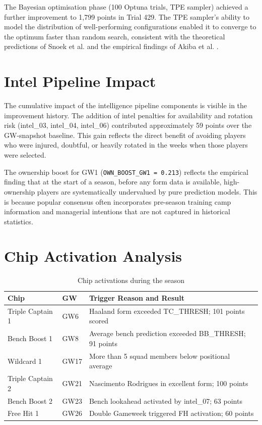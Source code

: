 The Bayesian optimisation phase (100 Optuna trials, TPE sampler) achieved a further improvement to 1,799 points in Trial 429. The TPE sampler's ability to model the distribution of well-performing configurations enabled it to converge to the optimum faster than random search, consistent with the theoretical predictions of Snoek et al. \cite{snoek2012practical} and the empirical findings of Akiba et al. \cite{akiba2019optuna}.

\section{Intel Pipeline Impact}

The cumulative impact of the intelligence pipeline components is visible in the improvement history. The addition of intel penalties for availability and rotation risk (intel\_03, intel\_04, intel\_06) contributed approximately 59 points over the GW-snapshot baseline. This gain reflects the direct benefit of avoiding players who were injured, doubtful, or heavily rotated in the weeks when those players were selected.

The ownership boost for GW1 (\texttt{OWN\_BOOST\_GW1 = 0.213}) reflects the empirical finding that at the start of a season, before any form data is available, high-ownership players are systematically undervalued by pure prediction models. This is because popular consensus often incorporates pre-season training camp information and managerial intentions that are not captured in historical statistics.

\section{Chip Activation Analysis}

\begin{table}[h]
\centering
\caption{Chip activations during the season}
\label{tab:chips_en}
\begin{tabular}{llp{6.5cm}}
\toprule
\textbf{Chip} & \textbf{GW} & \textbf{Trigger Reason and Result} \\
\midrule
Triple Captain 1 & GW6  & Haaland form exceeded TC\_THRESH; 101 points scored \\
Bench Boost 1    & GW8  & Average bench prediction exceeded BB\_THRESH; 91 points \\
Wildcard 1       & GW17 & More than 5 squad members below positional average \\
Triple Captain 2 & GW21 & Nascimento Rodrigues in excellent form; 100 points \\
Bench Boost 2    & GW23 & Bench lookahead activated by intel\_07; 63 points \\
Free Hit 1       & GW26 & Double Gameweek triggered FH activation; 60 points \\
\bottomrule
\end{tabular}
\end{table}

